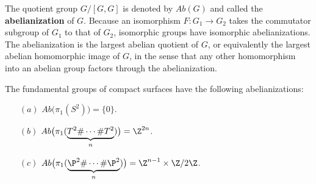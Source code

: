 The quotient group $G/[G,G]$ is denoted by $Ab(G)$ and called the \textbf{abelianization} of $G$. Because an isomorphism $F:G_1\to G_2$ takes the commutator subgroup of $G_1$ to that of $G_2$, isomorphic groups have isomorphic abelianizations. The abelianization is the largest abelian quotient of $G$, or equivalently the largest abelian homomorphic image of $G$, in the sense that any other homomorphism into an abelian group factors through the abelianization.
\begin{proposition}
The fundamental groups of compact surfaces have the following abelianizations:
\begin{itemize}
\item[$(a)$] $Ab\big(\pi_1(S^2)\big)=\{0\}$.
\item[$(b)$] $Ab\big(\pi_1(\underbrace{T^2\#\cdots\#T^2}_{n})\big)=\Z^{2n}$.
\item[$(c)$] $Ab\big(\pi_1(\underbrace{\P^2\#\cdots\#\P^2}_{n})\big)=\Z^{n-1}\times\Z/2\Z$.
\end{itemize}
\end{proposition}
